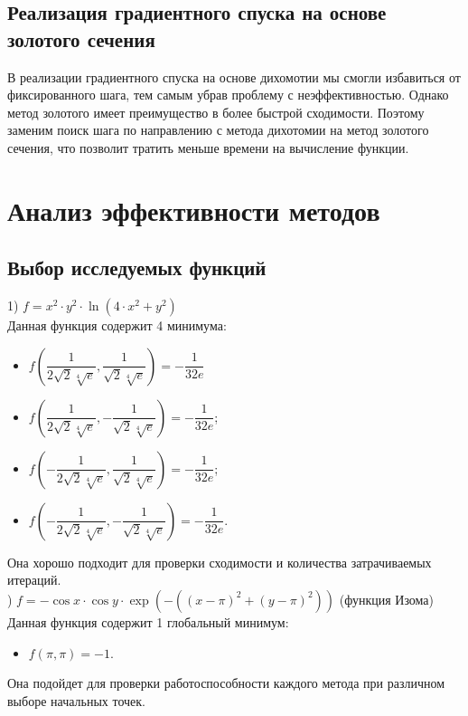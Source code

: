 \documentclass{article}
\begin{document}
\subsection*{Реализация градиентного спуска на основе золотого сечения}
В реализации градиентного спуска на основе дихомотии мы смогли избавиться от фиксированного шага, тем самым убрав проблему с неэффективностью. Однако метод золотого имеет преимущество в более быстрой сходимости. Поэтому заменим поиск шага по направлению с метода дихотомии на метод золотого сечения, что позволит тратить меньше времени на вычисление функции.

\newpage
\section*{Анализ эффективности методов}
\subsection*{Выбор исследуемых функций}
1) $f = x^2 \cdot y^2 \cdot \ln{(4 \cdot x^2 + y^2)}$ \\

\noindent Данная функция содержит 4 минимума:
\begin{itemize}
    \item $f(\dfrac{1}{2\sqrt{2}\sqrt[4]{e}}, \dfrac{1}{\sqrt{2}\sqrt[4]{e}}) = -\dfrac{1}{32e}$
    \item $f(\dfrac{1}{2\sqrt{2}\sqrt[4]{e}}, -\dfrac{1}{\sqrt{2}\sqrt[4]{e}}) = -\dfrac{1}{32e}$;
    \item $f(-\dfrac{1}{2\sqrt{2}\sqrt[4]{e}}, \dfrac{1}{\sqrt{2}\sqrt[4]{e}}) = -\dfrac{1}{32e}$;
    \item $f(-\dfrac{1}{2\sqrt{2}\sqrt[4]{e}}, -\dfrac{1}{\sqrt{2}\sqrt[4]{e}}) = -\dfrac{1}{32e}$.
\end{itemize}

\noindent Она хорошо подходит для проверки сходимости и количества затрачиваемых итераций.\\

) $f = -\cos{x} \cdot \cos{y} \cdot \exp{(-((x - \pi)^2 + (y - \pi)^2))}$ (функция Изома)\\

\noindent Данная функция содержит 1 глобальный минимум:
\begin{itemize}
    \item $f(\pi, \pi) = -1$.
\end{itemize}

\noindent Она подойдет для проверки работоспособности каждого метода при различном выборе начальных точек.
\end{document}
